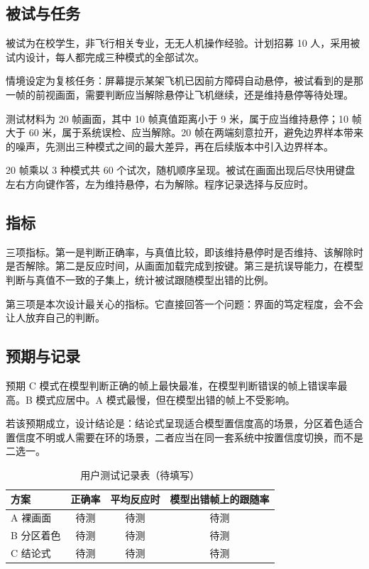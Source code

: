 \documentclass[12pt,a4paper]{ctexart}
\begin{document}
\subsection{被试与任务}

被试为在校学生，非飞行相关专业，无无人机操作经验。计划招募 10 人，采用被试内设计，每人都完成三种模式的全部试次。

情境设定为复核任务：屏幕提示某架飞机已因前方障碍自动悬停，被试看到的是那一帧的前视画面，需要判断应当解除悬停让飞机继续，还是维持悬停等待处理。

测试材料为 20 帧画面，其中 10 帧真值距离小于 9 米，属于应当维持悬停；10 帧大于 60 米，属于系统误检、应当解除。20 帧在两端刻意拉开，避免边界样本带来的噪声，先测出三种模式之间的最大差异，再在后续版本中引入边界样本。

20 帧乘以 3 种模式共 60 个试次，随机顺序呈现。被试在画面出现后尽快用键盘左右方向键作答，左为维持悬停，右为解除。程序记录选择与反应时。

\subsection{指标}

三项指标。第一是判断正确率，与真值比较，即该维持悬停时是否维持、该解除时是否解除。第二是反应时间，从画面加载完成到按键。第三是抗误导能力，在模型判断与真值不一致的子集上，统计被试跟随模型出错的比例。

第三项是本次设计最关心的指标。它直接回答一个问题：界面的笃定程度，会不会让人放弃自己的判断。

\subsection{预期与记录}

预期 C 模式在模型判断正确的帧上最快最准，在模型判断错误的帧上错误率最高。B 模式应居中。A 模式最慢，但在模型出错的帧上不受影响。

若该预期成立，设计结论是：结论式呈现适合模型置信度高的场景，分区着色适合置信度不明或人需要在环的场景，二者应当在同一套系统中按置信度切换，而不是二选一。

\begin{table}[htbp]
\centering
\caption{用户测试记录表（待填写）}
\label{tab:result}
\begin{tabular}{lccc}
\toprule
方案 & 正确率 & 平均反应时 & 模型出错帧上的跟随率 \\
\midrule
A 裸画面 & 待测 & 待测 & 待测 \\
B 分区着色 & 待测 & 待测 & 待测 \\
C 结论式 & 待测 & 待测 & 待测 \\
\bottomrule
\end{tabular}
\end{table}
\end{document}
